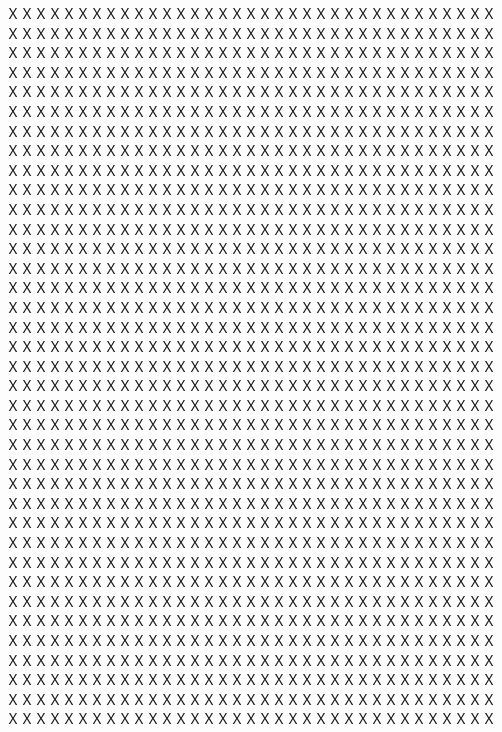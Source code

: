\documentclass[]{ltjsarticle}
\begin{document}
ＸＸＸＸＸＸＸＸＸＸＸＸＸＸＸＸＸＸＸＸＸＸＸＸＸＸＸＸＸＸＸＸＸＸＸ
ＸＸＸＸＸＸＸＸＸＸＸＸＸＸＸＸＸＸＸＸＸＸＸＸＸＸＸＸＸＸＸＸＸＸＸ
ＸＸＸＸＸＸＸＸＸＸＸＸＸＸＸＸＸＸＸＸＸＸＸＸＸＸＸＸＸＸＸＸＸＸＸ
ＸＸＸＸＸＸＸＸＸＸＸＸＸＸＸＸＸＸＸＸＸＸＸＸＸＸＸＸＸＸＸＸＸＸＸ
ＸＸＸＸＸＸＸＸＸＸＸＸＸＸＸＸＸＸＸＸＸＸＸＸＸＸＸＸＸＸＸＸＸＸＸ
ＸＸＸＸＸＸＸＸＸＸＸＸＸＸＸＸＸＸＸＸＸＸＸＸＸＸＸＸＸＸＸＸＸＸＸ
ＸＸＸＸＸＸＸＸＸＸＸＸＸＸＸＸＸＸＸＸＸＸＸＸＸＸＸＸＸＸＸＸＸＸＸ
ＸＸＸＸＸＸＸＸＸＸＸＸＸＸＸＸＸＸＸＸＸＸＸＸＸＸＸＸＸＸＸＸＸＸＸ
ＸＸＸＸＸＸＸＸＸＸＸＸＸＸＸＸＸＸＸＸＸＸＸＸＸＸＸＸＸＸＸＸＸＸＸ
ＸＸＸＸＸＸＸＸＸＸＸＸＸＸＸＸＸＸＸＸＸＸＸＸＸＸＸＸＸＸＸＸＸＸＸ
ＸＸＸＸＸＸＸＸＸＸＸＸＸＸＸＸＸＸＸＸＸＸＸＸＸＸＸＸＸＸＸＸＸＸＸ
ＸＸＸＸＸＸＸＸＸＸＸＸＸＸＸＸＸＸＸＸＸＸＸＸＸＸＸＸＸＸＸＸＸＸＸ
ＸＸＸＸＸＸＸＸＸＸＸＸＸＸＸＸＸＸＸＸＸＸＸＸＸＸＸＸＸＸＸＸＸＸＸ
ＸＸＸＸＸＸＸＸＸＸＸＸＸＸＸＸＸＸＸＸＸＸＸＸＸＸＸＸＸＸＸＸＸＸＸ
ＸＸＸＸＸＸＸＸＸＸＸＸＸＸＸＸＸＸＸＸＸＸＸＸＸＸＸＸＸＸＸＸＸＸＸ
ＸＸＸＸＸＸＸＸＸＸＸＸＸＸＸＸＸＸＸＸＸＸＸＸＸＸＸＸＸＸＸＸＸＸＸ
ＸＸＸＸＸＸＸＸＸＸＸＸＸＸＸＸＸＸＸＸＸＸＸＸＸＸＸＸＸＸＸＸＸＸＸ
ＸＸＸＸＸＸＸＸＸＸＸＸＸＸＸＸＸＸＸＸＸＸＸＸＸＸＸＸＸＸＸＸＸＸＸ
ＸＸＸＸＸＸＸＸＸＸＸＸＸＸＸＸＸＸＸＸＸＸＸＸＸＸＸＸＸＸＸＸＸＸＸ
ＸＸＸＸＸＸＸＸＸＸＸＸＸＸＸＸＸＸＸＸＸＸＸＸＸＸＸＸＸＸＸＸＸＸＸ
ＸＸＸＸＸＸＸＸＸＸＸＸＸＸＸＸＸＸＸＸＸＸＸＸＸＸＸＸＸＸＸＸＸＸＸ
ＸＸＸＸＸＸＸＸＸＸＸＸＸＸＸＸＸＸＸＸＸＸＸＸＸＸＸＸＸＸＸＸＸＸＸ
ＸＸＸＸＸＸＸＸＸＸＸＸＸＸＸＸＸＸＸＸＸＸＸＸＸＸＸＸＸＸＸＸＸＸＸ
ＸＸＸＸＸＸＸＸＸＸＸＸＸＸＸＸＸＸＸＸＸＸＸＸＸＸＸＸＸＸＸＸＸＸＸ
ＸＸＸＸＸＸＸＸＸＸＸＸＸＸＸＸＸＸＸＸＸＸＸＸＸＸＸＸＸＸＸＸＸＸＸ
ＸＸＸＸＸＸＸＸＸＸＸＸＸＸＸＸＸＸＸＸＸＸＸＸＸＸＸＸＸＸＸＸＸＸＸ
ＸＸＸＸＸＸＸＸＸＸＸＸＸＸＸＸＸＸＸＸＸＸＸＸＸＸＸＸＸＸＸＸＸＸＸ
ＸＸＸＸＸＸＸＸＸＸＸＸＸＸＸＸＸＸＸＸＸＸＸＸＸＸＸＸＸＸＸＸＸＸＸ
ＸＸＸＸＸＸＸＸＸＸＸＸＸＸＸＸＸＸＸＸＸＸＸＸＸＸＸＸＸＸＸＸＸＸＸ
ＸＸＸＸＸＸＸＸＸＸＸＸＸＸＸＸＸＸＸＸＸＸＸＸＸＸＸＸＸＸＸＸＸＸＸ
ＸＸＸＸＸＸＸＸＸＸＸＸＸＸＸＸＸＸＸＸＸＸＸＸＸＸＸＸＸＸＸＸＸＸＸ
ＸＸＸＸＸＸＸＸＸＸＸＸＸＸＸＸＸＸＸＸＸＸＸＸＸＸＸＸＸＸＸＸＸＸＸ
ＸＸＸＸＸＸＸＸＸＸＸＸＸＸＸＸＸＸＸＸＸＸＸＸＸＸＸＸＸＸＸＸＸＸＸ
ＸＸＸＸＸＸＸＸＸＸＸＸＸＸＸＸＸＸＸＸＸＸＸＸＸＸＸＸＸＸＸＸＸＸＸ
ＸＸＸＸＸＸＸＸＸＸＸＸＸＸＸＸＸＸＸＸＸＸＸＸＸＸＸＸＸＸＸＸＸＸＸ
ＸＸＸＸＸＸＸＸＸＸＸＸＸＸＸＸＸＸＸＸＸＸＸＸＸＸＸＸＸＸＸＸＸＸＸ
ＸＸＸＸＸＸＸＸＸＸＸＸＸＸＸＸＸＸＸＸＸＸＸＸＸＸＸＸＸＸＸＸＸＸＸ
\end{document}
